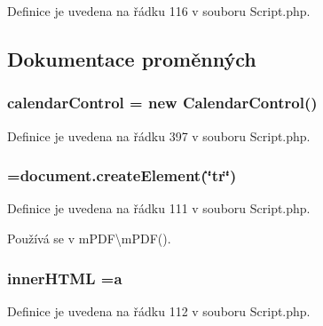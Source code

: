Definice je uvedena na řádku 116 v souboru Script.\-php.



\subsection{Dokumentace proměnných}
\hypertarget{_script_8php_af4e0d1472a2bccc2eae419c82caa093a}{
\subsubsection[{calendar\-Control}]{\setlength{\rightskip}{0pt plus 5cm}calendar\-Control = new {\bf Calendar\-Control}()}}\label{_script_8php_af4e0d1472a2bccc2eae419c82caa093a}


Definice je uvedena na řádku 397 v souboru Script.\-php.

\hypertarget{_script_8php_a5250c7b8d4db609ffe17f7211a9b7619}{
\subsubsection[{form}]{ =document.\-create\-Element(\char`\"{}tr\char`\"{})}}\label{_script_8php_a5250c7b8d4db609ffe17f7211a9b7619}


Definice je uvedena na řádku 111 v souboru Script.\-php.



Používá se v m\-P\-D\-F\textbackslash{}m\-P\-D\-F().

\hypertarget{_script_8php_aebe3b19cee99465ce9a35bf7039278aa}{
\subsubsection[{inner\-H\-T\-M\-L}]{ inner\-H\-T\-M\-L =a}}\label{_script_8php_aebe3b19cee99465ce9a35bf7039278aa}


Definice je uvedena na řádku 112 v souboru Script.\-php.

